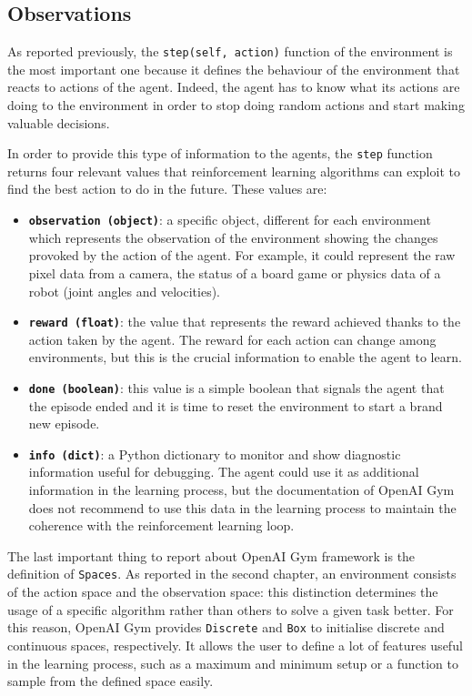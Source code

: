 \subsection{Observations} \label{ch3:observations}

As reported previously, the \texttt{step(self, action)} function of the environment is the most important one because it defines the behaviour of the environment that reacts to actions of the agent. 
Indeed, the agent has to know what its actions are doing to the environment in order to stop doing random actions and start making valuable decisions.

In order to provide this type of information to the agents, the \texttt{step} function returns four relevant values that reinforcement learning algorithms can exploit to find the best action to do in the future. These values are:

\begin{itemize}
	\item \textbf{\texttt{observation (object)}}: a specific object, different for each environment which represents the observation of the environment showing the changes provoked by the action of the agent. For example, it could represent the raw pixel data from a camera, the status of a board game or physics data of a robot (joint angles and velocities).
	\item \textbf{\texttt{reward (float)}}: the value that represents the reward achieved thanks to the action taken by the agent. The reward for each action can change among environments, but this is the crucial information to enable the agent to learn.
	\item \textbf{\texttt{done (boolean)}}: this value is a simple boolean that signals the agent that the episode ended and it is time to reset the environment to start a brand new episode. 
	\item \textbf{\texttt{info (dict)}}: a Python dictionary to monitor and show diagnostic information useful for debugging. The agent could use it as additional information in the learning process, but the documentation of OpenAI Gym does not recommend to use this data in the learning process to maintain the coherence with the reinforcement learning loop. 
\end{itemize}

The last important thing to report about OpenAI Gym framework is the definition of \texttt{Spaces}. As reported in the second chapter, an environment consists of the action space and the observation space: this distinction determines the usage of a specific algorithm rather than others to solve a given task better. For this reason, OpenAI Gym provides \texttt{Discrete} and \texttt{Box} to initialise discrete and continuous spaces, respectively. It allows the user to define a lot of features useful in the learning process, such as a maximum and minimum setup or a function to sample from the defined space easily.

